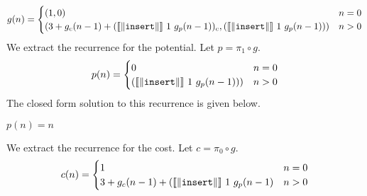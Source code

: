 %
\begin{equation}
  \label{eq:sort_rec_final}
  g(n) = \begin{cases}
    (1,0) & n=0 \\
    (3 + g_c(n-1) + (\llbracket\|\texttt{insert}\|\rrbracket\ 1\ g_p(n-1))_c, (\llbracket\|\texttt{insert}\|\rrbracket\ 1\ g_p(n-1))) & n > 0
  \end{cases}
\end{equation}
%
We extract the recurrence for the potential.
Let $p = \pi_1 \circ g$.
%
\begin{equation}
  \label{eq:sort_rec_potential}
  p(n) = \begin{cases}
    0 & n=0 \\
  (\llbracket\|\texttt{insert}\|\rrbracket\ 1\ g_p(n-1))) & n > 0
  \end{cases}
\end{equation}
%
The closed form solution to this recurrence is given below.
%
\begin{lemma}
  \label{lem:sort_potential}
  $p(n) = n$
\end{lemma}
%
We extract the recurrence for the cost.
Let $c = \pi_0 \circ g$.
%
\begin{equation}
  \label{eq:sort_rec_cost}
  c(n) = \begin{cases}
    1 & n=0 \\
    3 + g_c(n-1) + (\llbracket\|\texttt{insert}\|\rrbracket\ 1\ g_p(n-1) & n > 0
  \end{cases}
\end{equation}
%

